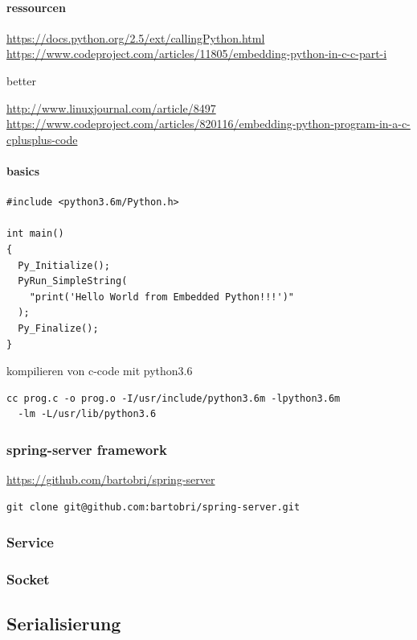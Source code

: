 \documentclass[a4paper,10pt]{article}
\begin{document}
\paragraph{ressourcen}

\url{https://docs.python.org/2.5/ext/callingPython.html}
\url{https://www.codeproject.com/articles/11805/embedding-python-in-c-c-part-i}

better

\url{http://www.linuxjournal.com/article/8497}
\url{https://www.codeproject.com/articles/820116/embedding-python-program-in-a-c-cplusplus-code}

\paragraph{basics}

\begin{lstlisting}
#include <python3.6m/Python.h>

int main()
{
  Py_Initialize();
  PyRun_SimpleString(
    "print('Hello World from Embedded Python!!!')"
  );
  Py_Finalize();
}
\end{lstlisting}

kompilieren von c-code mit python3.6

\begin{lstlisting}
cc prog.c -o prog.o -I/usr/include/python3.6m -lpython3.6m 
  -lm -L/usr/lib/python3.6
\end{lstlisting}

\subsubsection{spring-server framework}

\url{https://github.com/bartobri/spring-server}

\begin{lstlisting}
git clone git@github.com:bartobri/spring-server.git
\end{lstlisting}

\subsubsection{Service}
\subsubsection{Socket}

\subsection{Serialisierung}
\end{document}

